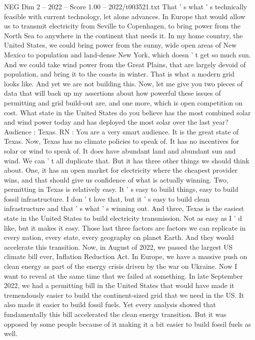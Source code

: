 \begin{textsample}{NEG Dim 2 – 2022 – Score 1.00 – 2022/t003521.txt}
That ' s what ' s technically feasible with current technology, let alone advances.
In Europe that would allow us to transmit electricity from Seville to Copenhagen, to bring power from the North Sea to anywhere in the continent that needs it.
In my home country, the United States, we could bring power from the sunny, wide open areas of New Mexico to population and land-dense New York, which doesn ' t get so much sun.
And we could take wind power from the Great Plains, that are largely devoid of population, and bring it to the coasts in winter.
That is what a modern grid looks like.
And yet we are not building this.
Now, let me give you two pieces of data that will back up my assertions about how powerful these issues of permitting and grid build-out are, and one more, which is open competition on cost.
What state in the United States do you believe has the most combined solar and wind power today and has deployed the most solar over the last year?
Audience : Texas.
RN : You are a very smart audience.
It is the great state of Texas.
Now, Texas has no climate policies to speak of.
It has no incentives for solar or wind to speak of.
It does have abundant land and abundant sun and wind.
We can ' t all duplicate that.
But it has three other things we should think about.
One, it has an open market for electricity where the cheapest provider wins, and that should give us confidence of what is actually winning.
Two, permitting in Texas is relatively easy.
It ' s easy to build things, easy to build fossil infrastructure.
I don ' t love that, but it ' s easy to build clean infrastructure and that ' s what ' s winning out.
And three, Texas is the easiest state in the United States to build electricity transmission.
Not as easy as I ' d like, but it makes it easy.
Those last three factors are factors we can replicate in every nation, every state, every geography on planet Earth.
And they would accelerate this transition.
Now, in August of 2022, we passed the largest US climate bill ever, Inflation Reduction Act.
In Europe, we have a massive push on clean energy as part of the energy crisis driven by the war on Ukraine.
Now I want to reveal at the same time that we failed at something.
In late September 2022, we had a permitting bill in the United States that would have made it tremendously easier to build the continent-sized grid that we need in the US.
It also made it easier to build fossil fuels.
Yet every analysis showed that fundamentally this bill accelerated the clean energy transition.
But it was opposed by some people because of it making it a bit easier to build fossil fuels as well.

\end{textsample}

